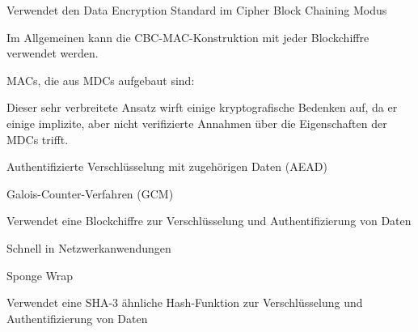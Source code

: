 \documentclass[a4paper]{article}
\begin{document}
\begin{multicols}{3}
\begin{itemize*}
\begin{itemize*}
                  \begin{itemize*}
                        \item Verwendet den Data Encryption Standard im Cipher Block Chaining Modus
                        \item Im Allgemeinen kann die CBC-MAC-Konstruktion mit jeder Blockchiffre verwendet werden.
                  \end{itemize*}
                  \item MACs, die aus MDCs aufgebaut sind:
                  \begin{itemize*}
                        \item Dieser sehr verbreitete Ansatz wirft einige kryptografische Bedenken auf, da er einige implizite, aber nicht verifizierte Annahmen über die Eigenschaften der MDCs trifft.
                  \end{itemize*}
            \end{itemize*}
            \item Authentifizierte Verschlüsselung mit zugehörigen Daten (AEAD)
            \begin{itemize*}
                  \item Galois-Counter-Verfahren (GCM)
                  \begin{itemize*}
                        \item Verwendet eine Blockchiffre zur Verschlüsselung und Authentifizierung von Daten
                        \item Schnell in Netzwerkanwendungen
                  \end{itemize*}
                  \item Sponge Wrap
                  \begin{itemize*}
                        \item Verwendet eine SHA-3 ähnliche Hash-Funktion zur Verschlüsselung und Authentifizierung von Daten
                  \end{itemize*}
            \end{itemize*}
      \end{itemize*}



\end{multicols}
\end{document}
